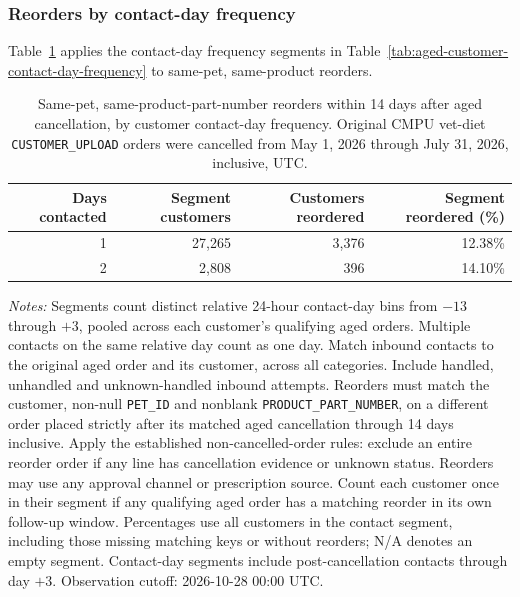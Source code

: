 
\subsubsection{Reorders by contact-day frequency}
Table~\ref{tab:contact-frequency-same-pet-part-reorders} applies the contact-day
frequency segments in Table~\ref{tab:aged-customer-contact-day-frequency}
to same-pet, same-product reorders.

\begin{table}[!htbp]
\centering
\caption{Same-pet, same-product-part-number reorders within 14 days after aged cancellation, by customer contact-day frequency. Original CMPU vet-diet \texttt{CUSTOMER\_UPLOAD} orders were cancelled from May 1, 2026 through July 31, 2026, inclusive, UTC.}
\label{tab:contact-frequency-same-pet-part-reorders}
\begin{tabular}{@{}rrrr@{}}
\toprule
Days contacted & Segment customers & Customers reordered & Segment reordered (\%) \\
\midrule
1 & 27,265 & 3,376 & 12.38\% \\
2 & 2,808 & 396 & 14.10\% \\
\bottomrule
\end{tabular}

\begin{minipage}{\linewidth}
\footnotesize
\textit{Notes:} Segments count distinct relative 24-hour contact-day bins from
$-13$ through $+3$, pooled across each customer's qualifying aged orders.
Multiple contacts on the same relative day count as one day. Match inbound
contacts to the original aged order and its customer, across all categories.
Include handled, unhandled and unknown-handled inbound attempts. Reorders must match the customer, non-null \texttt{PET\_ID} and nonblank
\texttt{PRODUCT\_PART\_NUMBER}, on a different order placed strictly after
its matched aged cancellation through 14 days inclusive. Apply the established
non-cancelled-order rules: exclude an entire reorder order if any line has
cancellation evidence or unknown status. Reorders may use any approval channel
or prescription source. Count each customer once in their segment if any
qualifying aged order has a matching reorder in its own follow-up window.
Percentages use all customers in the contact segment, including those missing
matching keys or without reorders; N/A denotes an empty segment. Contact-day
segments include post-cancellation contacts through day $+3$.
Observation cutoff: 2026-10-28 00:00 UTC.
\end{minipage}
\end{table}

